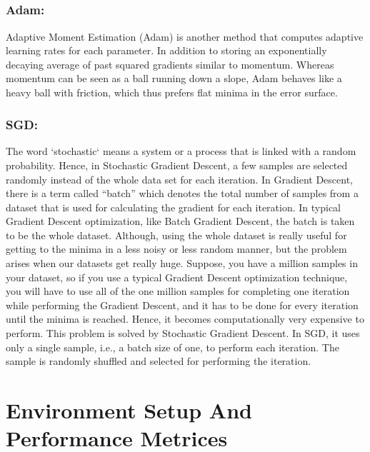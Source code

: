 \documentclass{report}
\begin{document}
\paragraph{}

\subsection{Adam: }
Adaptive Moment Estimation (Adam) is another method that computes adaptive learning rates for each parameter. In addition to storing an exponentially decaying average of past squared gradients similar to momentum. Whereas momentum can be seen as a ball running down a slope, Adam behaves like a heavy ball with friction, which thus prefers flat minima in the error surface.
\paragraph{}

\subsection{SGD: }
The word ‘stochastic‘ means a system or a process that is linked with a random probability. Hence, in Stochastic Gradient Descent, a few samples are selected randomly instead of the whole data set for each iteration. In Gradient Descent, there is a term called “batch” which denotes the total number of samples from a dataset that is used for calculating the gradient for each iteration. In typical Gradient Descent optimization, like Batch Gradient Descent, the batch is taken to be the whole dataset. Although, using the whole dataset is really useful for getting to the minima in a less noisy or less random manner, but the problem arises when our datasets get really huge.
Suppose, you have a million samples in your dataset, so if you use a typical Gradient Descent optimization technique, you will have to use all of the one million samples for completing one iteration while performing the Gradient Descent, and it has to be done for every iteration until the minima is reached. Hence, it becomes computationally very expensive to perform.
This problem is solved by Stochastic Gradient Descent. In SGD, it uses only a single sample, i.e., a batch size of one, to perform each iteration. The sample is randomly shuffled and selected for performing the iteration.

\chapter{Environment Setup And Performance Metrices}
\end{document}
